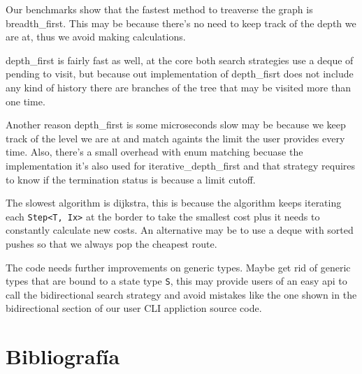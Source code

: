 Our benchmarks show that the fastest method to treaverse the graph is breadth\_first. This may be because there's
no need to keep track of the depth we are at, thus we avoid making calculations.

depth\_first is fairly fast as well,
at the core both search strategies use a deque of pending to visit, but because out implementation of depth\_fisrt
does not include any kind of history there are branches of the tree that may be visited more than one time.

Another reason depth\_first is some microseconds slow may be because we keep track of the level we are at and
match againts the limit the user provides every time. Also, there's a small overhead with enum matching becuase
the implementation it's also used for iterative\_depth\_first and that strategy requires to know if the termination
status is because a limit cutoff.

The slowest algorithm is dijkstra, this is because the algorithm keeps iterating each \texttt{Step<T, Ix>} at the border to take the smallest cost plus
it needs to constantly calculate new costs. An alternative may be to use a deque with sorted pushes so that we always pop
the cheapest route.

The code needs further improvements on generic types. Maybe get rid of generic types that are bound to a state
type \texttt{S},
this may provide users of an easy api to call the bidirectional search strategy and avoid mistakes like the one
shown in the bidirectional section of our user CLI appliction source code.

\newpage
\section{Bibliografía}
\printbibliography[heading=none]